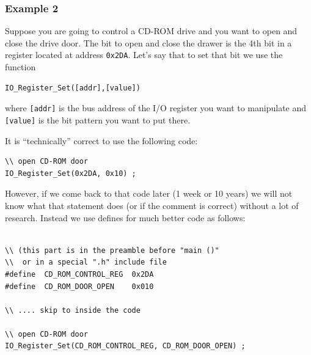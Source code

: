 %
%
%
%
%
%
%




\subsubsection{Example 2}
Suppose you are going to control a CD-ROM drive and you want
to open and close the drive door.  The bit to open and close
the drawer is the 4th bit in a register located at address
{\tt 0x2DA}.  Let's say that to set that bit we use the function
\begin{verbatim}
IO_Register_Set([addr],[value])
\end{verbatim}
where {\tt [addr]}
is the bus address of the I/O register you want to manipulate
and {\tt [value]} is the bit pattern you want to put there.

It is ``technically'' correct to use the following code:
\begin{verbatim}
\\ open CD-ROM door
IO_Register_Set(0x2DA, 0x10) ;
\end{verbatim}



However, if we come back to that code later (1 week or 10 years)
we will not know what that statement does (or if the comment is
correct) without a lot of research.  Instead we use defines
for much better code as follows:
\begin{verbatim}

\\ (this part is in the preamble before "main ()"
\\  or in a special ".h" include file
#define  CD_ROM_CONTROL_REG  0x2DA
#define  CD_ROM_DOOR_OPEN    0x010

\\ .... skip to inside the code

\\ open CD-ROM door
IO_Register_Set(CD_ROM_CONTROL_REG, CD_ROM_DOOR_OPEN) ;

\end{verbatim}

